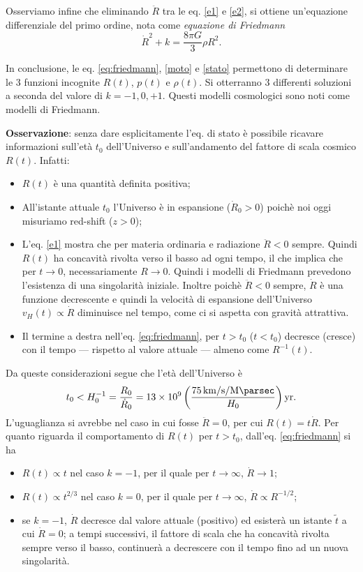 Osserviamo infine che eliminando $\ddot{R}$ tra le eq.  \eqref{e1} e \eqref{e2},
si ottiene un'equazione differenziale del primo ordine, nota come
\emph{equazione di Friedmann}
\begin{equation}
  \dot{R}^2 +k = \frac{8 \pi G}{3} \rho R^2.
  \label{eq:friedmann}
\end{equation}

In conclusione, le eq. \eqref{eq:friedmann}, \eqref{moto} e \eqref{stato}
permettono di determinare le 3 funzioni incognite $R(t)$, $p(t)$ e $\rho(t)$.
Si otterranno 3 differenti soluzioni a seconda del valore di $k=-1,0,+1$.
Questi modelli cosmologici sono noti come modelli di Friedmann.

\textbf{Osservazione}: senza dare esplicitamente l'eq. di stato è possibile
ricavare informazioni sull'età $t_0$ dell'Universo e sull'andamento del fattore
di scala cosmico $R(t)$.  Infatti:
\begin{itemize}
\item $R(t)$ è una quantità definita positiva;
\item All'istante attuale $t_0$ l'Universo è in espansione ($\dot{R}_0 >0$)
  poichè noi oggi misuriamo red-shift ($z>0$);
\item L'eq. \eqref{e1} mostra che per materia ordinaria e radiazione $ \ddot{R}
  < 0$ sempre.  Quindi $R(t)$ ha concavità rivolta verso il basso ad ogni tempo,
  il che implica che per $t\rightarrow 0$, necessariamente $R \rightarrow 0$.
  Quindi i modelli di Friedmann prevedono l'esistenza di una singolarità
  iniziale.  Inoltre poichè $ \ddot{R} < 0$ sempre, $\dot{R}$ è una funzione
  decrescente e quindi la velocità di espansione dell'Universo $v_H(t) \propto
  \dot{R}$ diminuisce nel tempo, come ci si aspetta con gravità attrattiva.
\item Il termine a destra nell'eq. \eqref{eq:friedmann}, per $t>t_0$ ($t<t_0$)
  decresce (cresce) con il tempo --- rispetto al valore attuale --- almeno come
  $R^{-1}(t)$.
\end{itemize}

Da queste considerazioni segue che l'età dell'Universo è
\begin{equation}
  t_0 < H^{-1}_0  = \frac {R_0}{\dot{R}_0} = 13 \times 10^{9}
  \left(\frac{\SI[per-mode=reciprocal]{75}{\kilo\metre\per\second\per\mega\parsec}}{H_0}\right)
  \si{yr}.
\end{equation}
L'uguaglianza si avrebbe nel caso in cui fosse $\ddot{R} =0$, per cui $R(t)=t
\dot{R}$.  Per quanto riguarda il comportamento di $R(t)$ per $t>t_0$,
dall'eq. \eqref{eq:friedmann} si ha
\begin{itemize}
\item $R(t) \propto t$ nel caso $k=-1$, per il quale per $t \to \infty$,
  $\dot{R} \to 1$;
\item $R(t) \propto t^{2/3}$ nel caso $k=0$, per il quale per $t \to \infty$,
  $\dot{R} \propto R^{-1/2}$;
\item se $k=-1$, $\dot{R}$ decresce dal valore attuale (positivo) ed esisterà un
  istante $\tilde{t}$ a cui ${\dot R}=0$; a tempi successivi, il fattore di
  scala che ha concavità rivolta sempre verso il basso, continuerà a decrescere
  con il tempo fino ad un nuova singolarità.
\end{itemize}

